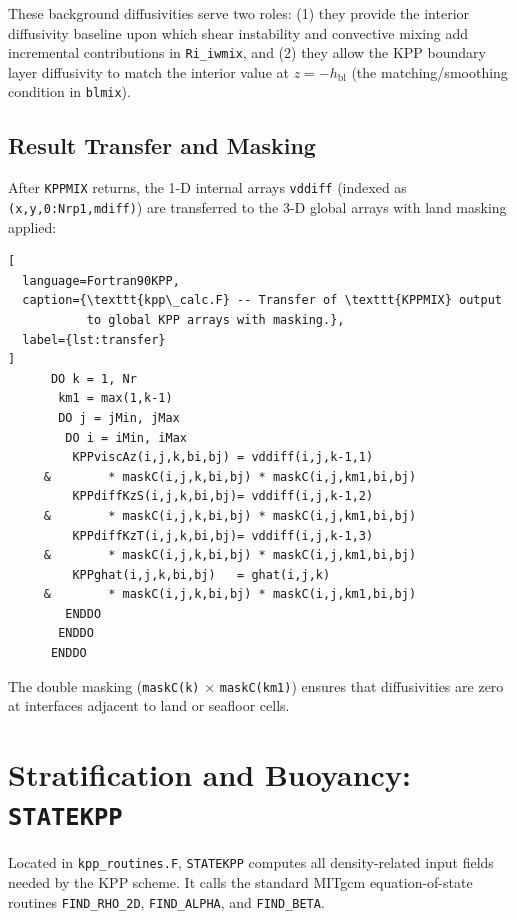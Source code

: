 \documentclass[12pt,letterpaper]{article}
\newcommand{\hbl}{h_{\mathrm{bl}}}
\begin{document}
These background diffusivities serve two roles: (1) they provide the  
interior diffusivity baseline upon which shear instability and convective  
mixing add incremental contributions in \texttt{Ri\_iwmix}, and (2) they  
allow the KPP boundary layer diffusivity to match the interior value  
at $z = -\hbl$ (the matching/smoothing condition in \texttt{blmix}).  
  
\subsection{Result Transfer and Masking}  
  
After \texttt{KPPMIX} returns, the 1-D internal arrays \texttt{vddiff}  
(indexed as \texttt{(x,y,0:Nrp1,mdiff)}) are transferred to the 3-D  
global arrays with land masking applied:  
  
\begin{lstlisting}[  
  language=Fortran90KPP,  
  caption={\texttt{kpp\_calc.F} -- Transfer of \texttt{KPPMIX} output  
           to global KPP arrays with masking.},  
  label={lst:transfer}  
]  
      DO k = 1, Nr  
       km1 = max(1,k-1)  
       DO j = jMin, jMax  
        DO i = iMin, iMax  
         KPPviscAz(i,j,k,bi,bj) = vddiff(i,j,k-1,1)  
     &        * maskC(i,j,k,bi,bj) * maskC(i,j,km1,bi,bj)  
         KPPdiffKzS(i,j,k,bi,bj)= vddiff(i,j,k-1,2)  
     &        * maskC(i,j,k,bi,bj) * maskC(i,j,km1,bi,bj)  
         KPPdiffKzT(i,j,k,bi,bj)= vddiff(i,j,k-1,3)  
     &        * maskC(i,j,k,bi,bj) * maskC(i,j,km1,bi,bj)  
         KPPghat(i,j,k,bi,bj)   = ghat(i,j,k)  
     &        * maskC(i,j,k,bi,bj) * maskC(i,j,km1,bi,bj)  
        ENDDO  
       ENDDO  
      ENDDO  
\end{lstlisting}  
  
The double masking (\texttt{maskC(k)} $\times$ \texttt{maskC(km1)})  
ensures that diffusivities are zero at interfaces adjacent to land  
or seafloor cells.  
  
\section{Stratification and Buoyancy: \texttt{STATEKPP}}  
\label{sec:stratification_buoyancy}  
  
Located in \texttt{kpp\_routines.F}, \texttt{STATEKPP} computes all  
density-related input fields needed by the KPP scheme. It calls the  
standard MITgcm equation-of-state routines \texttt{FIND\_RHO\_2D},  
\texttt{FIND\_ALPHA}, and \texttt{FIND\_BETA}.  
  
\end{document}
